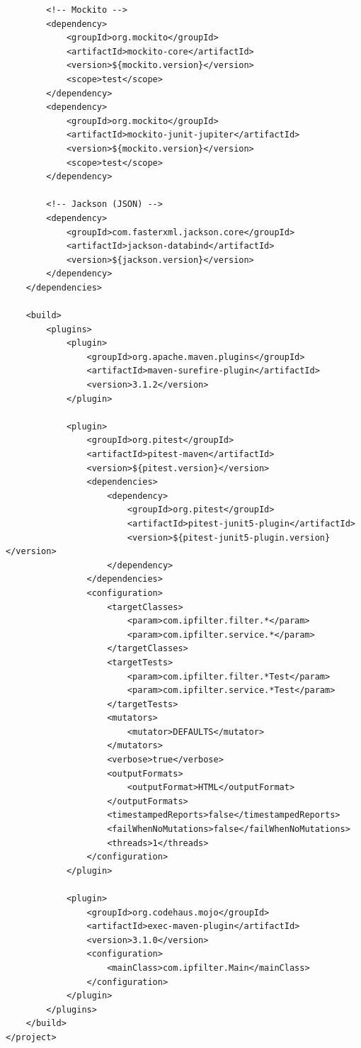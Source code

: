 \begin{verbatim}
        <!-- Mockito -->
        <dependency>
            <groupId>org.mockito</groupId>
            <artifactId>mockito-core</artifactId>
            <version>${mockito.version}</version>
            <scope>test</scope>
        </dependency>
        <dependency>
            <groupId>org.mockito</groupId>
            <artifactId>mockito-junit-jupiter</artifactId>
            <version>${mockito.version}</version>
            <scope>test</scope>
        </dependency>

        <!-- Jackson (JSON) -->
        <dependency>
            <groupId>com.fasterxml.jackson.core</groupId>
            <artifactId>jackson-databind</artifactId>
            <version>${jackson.version}</version>
        </dependency>
    </dependencies>

    <build>
        <plugins>
            <plugin>
                <groupId>org.apache.maven.plugins</groupId>
                <artifactId>maven-surefire-plugin</artifactId>
                <version>3.1.2</version>
            </plugin>

            <plugin>
                <groupId>org.pitest</groupId>
                <artifactId>pitest-maven</artifactId>
                <version>${pitest.version}</version>
                <dependencies>
                    <dependency>
                        <groupId>org.pitest</groupId>
                        <artifactId>pitest-junit5-plugin</artifactId>
                        <version>${pitest-junit5-plugin.version}</version>
                    </dependency>
                </dependencies>
                <configuration>
                    <targetClasses>
                        <param>com.ipfilter.filter.*</param>
                        <param>com.ipfilter.service.*</param>
                    </targetClasses>
                    <targetTests>
                        <param>com.ipfilter.filter.*Test</param>
                        <param>com.ipfilter.service.*Test</param>
                    </targetTests>
                    <mutators>
                        <mutator>DEFAULTS</mutator>
                    </mutators>
                    <verbose>true</verbose>
                    <outputFormats>
                        <outputFormat>HTML</outputFormat>
                    </outputFormats>
                    <timestampedReports>false</timestampedReports>
                    <failWhenNoMutations>false</failWhenNoMutations>
                    <threads>1</threads>
                </configuration>
            </plugin>

            <plugin>
                <groupId>org.codehaus.mojo</groupId>
                <artifactId>exec-maven-plugin</artifactId>
                <version>3.1.0</version>
                <configuration>
                    <mainClass>com.ipfilter.Main</mainClass>
                </configuration>
            </plugin>
        </plugins>
    </build>
</project>
\end{verbatim}

